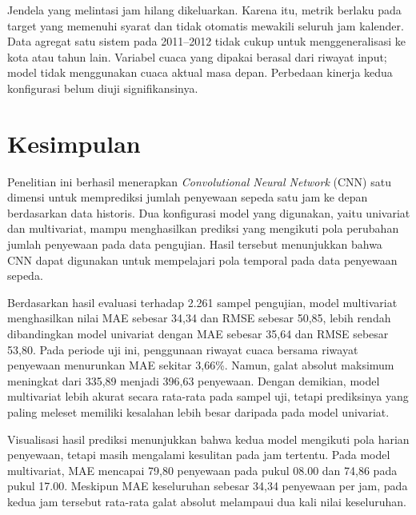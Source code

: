 \documentclass[10pt,conference]{IEEEtran}
\begin{document}
Jendela yang melintasi jam hilang dikeluarkan. Karena itu, metrik berlaku pada target yang memenuhi syarat dan tidak otomatis mewakili seluruh jam kalender. Data agregat satu sistem pada 2011--2012 tidak cukup untuk menggeneralisasi ke kota atau tahun lain. Variabel cuaca yang dipakai berasal dari riwayat input; model tidak menggunakan cuaca aktual masa depan. Perbedaan kinerja kedua konfigurasi belum diuji signifikansinya.

\section{Kesimpulan}
Penelitian ini berhasil menerapkan \textit{Convolutional Neural Network} (CNN) satu dimensi untuk memprediksi jumlah penyewaan sepeda satu jam ke depan berdasarkan data historis. Dua konfigurasi model yang digunakan, yaitu univariat dan multivariat, mampu menghasilkan prediksi yang mengikuti pola perubahan jumlah penyewaan pada data pengujian. Hasil tersebut menunjukkan bahwa CNN dapat digunakan untuk mempelajari pola temporal pada data penyewaan sepeda.

Berdasarkan hasil evaluasi terhadap 2.261 sampel pengujian, model multivariat menghasilkan nilai MAE sebesar 34,34 dan RMSE sebesar 50,85, lebih rendah dibandingkan model univariat dengan MAE sebesar 35,64 dan RMSE sebesar 53,80. Pada periode uji ini, penggunaan riwayat cuaca bersama riwayat penyewaan menurunkan MAE sekitar 3,66\%. Namun, galat absolut maksimum meningkat dari 335,89 menjadi 396,63 penyewaan. Dengan demikian, model multivariat lebih akurat secara rata-rata pada sampel uji, tetapi prediksinya yang paling meleset memiliki kesalahan lebih besar daripada pada model univariat.

Visualisasi hasil prediksi menunjukkan bahwa kedua model mengikuti pola harian penyewaan, tetapi masih mengalami kesulitan pada jam tertentu. Pada model multivariat, MAE mencapai 79,80 penyewaan pada pukul 08.00 dan 74,86 pada pukul 17.00. Meskipun MAE keseluruhan sebesar 34,34 penyewaan per jam, pada kedua jam tersebut rata-rata galat absolut melampaui dua kali nilai keseluruhan.
\end{document}
